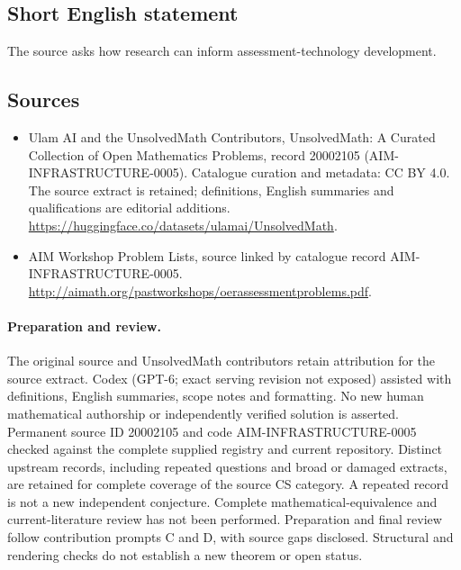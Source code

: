 \documentclass[11pt]{article}
\begin{document}
\subsection{Short English statement}
The source asks how research can inform assessment-technology development.
\subsection{Sources}
\begin{itemize}
\item[\hypertarget{source:20002105:1}{S1}] Ulam AI and the UnsolvedMath Contributors, UnsolvedMath: A Curated Collection of Open Mathematics Problems, record 20002105 (AIM-INFRASTRUCTURE-0005). Catalogue curation and metadata: CC BY 4.0. The source extract is retained; definitions, English summaries and qualifications are editorial additions.
\url{https://huggingface.co/datasets/ulamai/UnsolvedMath}.
\item[\hypertarget{source:20002105:2}{S2}] AIM Workshop Problem Lists, source linked by catalogue record AIM-INFRASTRUCTURE-0005.
\url{http://aimath.org/pastworkshops/oerassessmentproblems.pdf}.
\end{itemize}
\paragraph{Preparation and review.}
The original source and UnsolvedMath contributors retain attribution for the source extract. Codex (GPT-6; exact serving revision not exposed) assisted with definitions, English summaries, scope notes and formatting. No new human mathematical authorship or independently verified solution is asserted. Permanent source ID 20002105 and code AIM-INFRASTRUCTURE-0005 checked against the complete supplied registry and current repository. Distinct upstream records, including repeated questions and broad or damaged extracts, are retained for complete coverage of the source CS category. A repeated record is not a new independent conjecture. Complete mathematical-equivalence and current-literature review has not been performed. Preparation and final review follow contribution prompts C and D, with source gaps disclosed. Structural and rendering checks do not establish a new theorem or open status.
\label{end:20002105}
\end{document}
